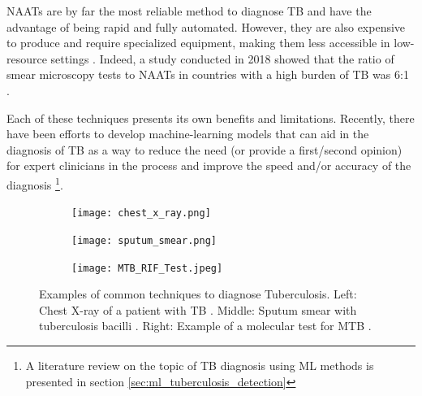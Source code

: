 \documentclass[../main.tex]{subfiles}
\begin{document}
    NAATs are by far the most reliable method to diagnose TB and have the advantage of being rapid and fully automated. However, they are also expensive to produce and require specialized equipment, making them less accessible in low-resource settings \cite{albert_development_2016, maclean_advances_2020}. Indeed, a study conducted in 2018 showed that the ratio of smear microscopy tests to NAATs in countries with a high burden of TB was 6:1 \cite{cazabon_market_2018, maclean_advances_2020}.

    Each of these techniques presents its own benefits and limitations. Recently, there have been efforts to develop machine-learning models that can aid in the diagnosis of TB as a way to reduce the need (or provide a first/second opinion) for expert clinicians in the process and improve the speed and/or accuracy of the diagnosis \footnote{A literature review on the topic of TB diagnosis using ML methods is presented in section \ref{sec:ml_tuberculosis_detection}}.

    \begin{figure}
        \begin{subfigure}{130px}
          \centering
            \texttt{[image: chest\_x\_ray.png]}
          \label{fig:chest_x_ray_example}
        \end{subfigure}%
        \begin{subfigure}{130px}
          \centering
          \texttt{[image: sputum\_smear.png]}
          \label{fig:sputum_smear_exmaple}
        \end{subfigure}
        \begin{subfigure}{130px}
          \centering
          \texttt{[image: MTB\_RIF\_Test.jpeg]}
          \label{fig:molecular_test_example}
        \end{subfigure}
        \caption{
            Examples of common techniques to diagnose Tuberculosis.
            Left: Chest X-ray of a patient with TB \cite{ubaidi_radiological_nodate}. Middle: Sputum smear with tuberculosis bacilli \cite{shah_ziehlneelsen_2017}. Right: Example of a molecular test for MTB \cite{boehme_rapid_2010}.
        }
        \label{fig:tuberculosis_diagnosis_examples}
    \end{figure}
    
\end{document}
